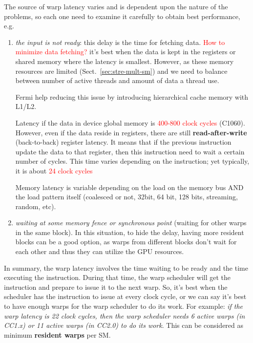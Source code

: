 The source of warp latency varies and is dependent upon the nature of
the problems, so each one need to examine it carefully to obtain best
performance, e.g.

\begin{enumerate}
\item {\it the input is not ready}: this delay is the time for
  fetching data.  \textcolor{red}{How to minimize data fetching?}
  it's best when the data is kept in the registers or shared memory
  where the latency is smallest. However, as these memory resources
  are limited (Sect.~\ref{sec:stre-mult-sm}) and we need to balance
  between number of active threads and amount of data a thread use.

  \begin{framed}
    Fermi help reducing this issue by introducing hierarchical cache
    memory with L1/L2.
  \end{framed}

  Latency if the data in device global memory is
  \textcolor{red}{400-800 clock cycles} (C1060). However, even if the
  data reside in registers, there are still {\bf read-after-write}
  (back-to-back) register latency. It means that if the previous
  instruction update the data to that register, then this
  instruction need to wait a certain number of cycles. This time
  varies depending on the instruction; yet typically, it is about
  \textcolor{red}{24 clock cycles}



\begin{mdframed}
Memory latency is variable depending on the load on the memory bus AND the load
pattern itself (coalesced or not, 32bit, 64 bit, 128 bits, streaming, random,
etc).  
\end{mdframed}

\item {\it waiting at some memory fence or synchronous point} (waiting
  for other warps in the same block). In this situation, to hide the
  delay, having more resident blocks can be a good option, as warps
  from different blocks don't wait for each other and thus they can
  utilize the GPU resources.

\end{enumerate}

In summary, the warp latency involves the time waiting to be ready and
the time executing the instruction. During that time, the warp
scheduler will get the instruction and prepare to issue it to the next
warp. So, it's best when the scheduler has the instruction to issue at
every clock cycle, or we can say it's best to have enough warps for
the warp scheduler to do its work. For example:
{\it if the warp latency is 22 clock cycles, then the warp scheduler
  needs 6 active warps (in CC1.x) or 11 active warps (in CC2.0) to do
  its work}.
This can be considered as minimum {\bf resident warps} per SM.

